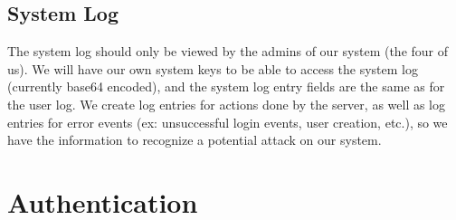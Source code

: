 \documentclass{article}
\begin{document}
\subsection{System Log}
The system log should only be viewed by the admins of our system (the four of us). We will have our own system keys to be able to access the system log (currently base64 encoded), and the system log entry fields are the same as for the user log. We create log entries for actions done by the server, as well as log entries for error events (ex: unsuccessful login events, user creation, etc.), so we have the information to recognize a potential attack on our system.

\section{Authentication}
\end{document}
